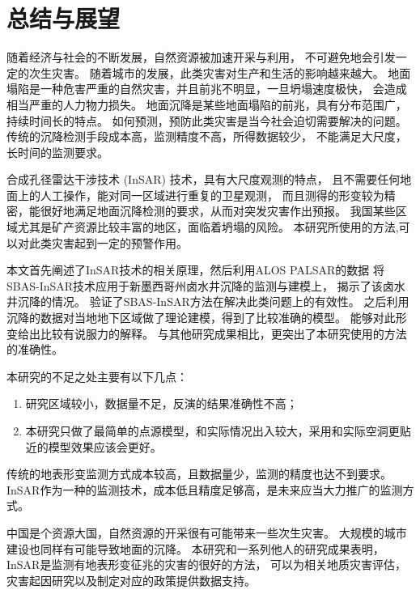 \chapter{总结与展望}
随着经济与社会的不断发展，自然资源被加速开采与利用，
不可避免地会引发一定的次生灾害。
随着城市的发展，此类灾害对生产和生活的影响越来越大。
地面塌陷是一种危害严重的自然灾害，并且前兆不明显，一旦坍塌速度极快，
会造成相当严重的人力物力损失。
地面沉降是某些地面塌陷的前兆，具有分布范围广，持续时间长的特点。
如何预测，预防此类灾害是当今社会迫切需要解决的问题。
传统的沉降检测手段成本高，监测精度不高，所得数据较少，
不能满足大尺度，长时间的监测要求。

合成孔径雷达干涉技术 (InSAR) 技术，具有大尺度观测的特点，
且不需要任何地面上的人工操作，能对同一区域进行重复的卫星观测，
而且测得的形变较为精密，能很好地满足地面沉降检测的要求，从而对突发灾害作出预报。
我国某些区域尤其是矿产资源比较丰富的地区，面临着坍塌的风险。
本研究所使用的方法,可以对此类灾害起到一定的预警作用。

本文首先阐述了InSAR技术的相关原理，然后利用ALOS PALSAR的数据
将SBAS-InSAR技术应用于新墨西哥州卤水井沉降的监测与建模上，
揭示了该卤水井沉降的情况。
验证了SBAS-InSAR方法在解决此类问题上的有效性。
之后利用沉降的数据对当地地下区域做了理论建模，得到了比较准确的模型。
能够对此形变给出比较有说服力的解释。
与其他研究成果相比，更突出了本研究使用的方法的准确性。

本研究的不足之处主要有以下几点：
\begin{enumerate}
    \item 研究区域较小，数据量不足，反演的结果准确性不高；
    \item 本研究只做了最简单的点源模型，和实际情况出入较大，采用和实际空洞更贴近的模型效果应该会更好。
\end{enumerate}

传统的地表形变监测方式成本较高，且数据量少，监测的精度也达不到要求。
InSAR作为一种的监测技术，成本低且精度足够高，是未来应当大力推广的监测方式。

中国是个资源大国，自然资源的开采很有可能带来一些次生灾害。
大规模的城市建设也同样有可能导致地面的沉降。
本研究和一系列他人的研究成果表明，InSAR是监测有地表形变征兆的灾害的很好的方法，
可以为相关地质灾害评估，灾害起因研究以及制定对应的政策提供数据支持。